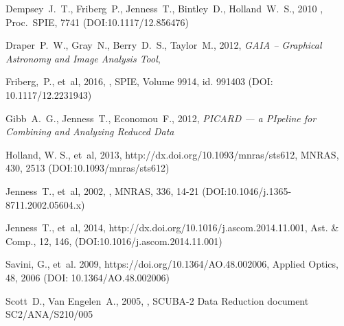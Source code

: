 \documentclass[11pt,oneside,chapters]{starlink}
\begin{document}
\begin{thebibliography}{}
Dempsey~J.~T., Friberg~P., Jenness~T., Bintley~D., Holland~W.~S., 2010
,
Proc.\ SPIE, 7741 (DOI:10.1117/12.856476)

Draper~P.~W., Gray~N., Berry~D.~S., Taylor~M., 2012,
\textit{GAIA -- Graphical Astronomy and Image Analysis Tool},

Friberg,~P., et~al, 2016, ,
SPIE, Volume 9914, id. 991403
(DOI: 10.1117/12.2231943)

Gibb~A.~G., Jenness~T., Economou~F., 2012, \textit{PICARD --- a
PIpeline for Combining and Analyzing Reduced Data}

Holland, W. S., et~al, 2013, 
{http://dx.doi.org/10.1093/mnras/sts612}, MNRAS, 430, 2513
(DOI:10.1093/mnras/sts612)

Jenness~T., et~al, 2002, ,
MNRAS, 336, 14-21 (DOI:10.1046/j.1365-8711.2002.05604.x)

Jenness~T., et~al, 2014,
 {http://dx.doi.org/10.1016/j.ascom.2014.11.001},
Ast. \& Comp., 12, 146, (DOI:10.1016/j.ascom.2014.11.001)

Savini, G., et~al. 2009,  {https://doi.org/10.1364/AO.48.002006},
Applied Optics, 48, 2006
(DOI: 10.1364/AO.48.002006)

Scott~D., Van Engelen~A., 2005, ,
SCUBA-2 Data Reduction document SC2/ANA/S210/005

\end{thebibliography}

\newpage
\appendix

\end{document}
